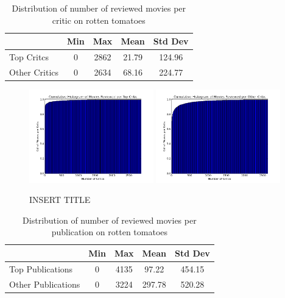\documentclass[12pt]{article}
\begin{document}
	\begin{table}[H]
	 \centering
	 \caption{Distribution of number of reviewed movies per critic on rotten tomatoes} 
	 \begin{tabular}{ l | c | c | c | c }
	 \hline
	 &  Min & Max & Mean & Std Dev  \\
	 \hline
	 Top Critcs & 0 & 2862 & 21.79 & 124.96 \\
	 Other Critics & 0 & 2634 & 68.16 & 224.77 \\
	 \hline
	 \end{tabular}
	 \end{table}

	\begin{figure}[H]
	    \centering
	    \includegraphics[width=0.48\textwidth]{plots/plot_r_crit_top.png}
	    \includegraphics[width=0.48\textwidth]{plots/plot_r_crit_oth.png}
	    \caption{INSERT TITLE}
	    \label{fig:r_crit}
	\end{figure}


	\begin{table}[H]
	 \centering
	 \caption{Distribution of number of reviewed movies per publication on rotten tomatoes} 
	 \begin{tabular}{ l | c | c | c | c }
	 \hline
	 &  Min & Max & Mean & Std Dev  \\
	 \hline
	 Top Publications & 0 & 4135 & 97.22 & 454.15 \\
	 Other Publications & 0 & 3224 & 297.78 & 520.28 \\
	 \hline
	 \end{tabular}
	 \end{table}
\end{document}
